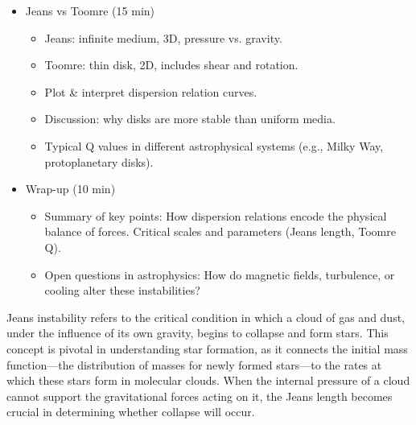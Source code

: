 \begin{itemize}
\begin{itemize}
    \item Define epicyclic frequency.

    \item Toomre parameter

  \end{itemize}
  
\item Jeans vs Toomre (15 min)

  \begin{itemize}
    \item Jeans: infinite medium, 3D, pressure vs. gravity.
    \item Toomre: thin disk, 2D, includes shear and rotation.

     \item Plot \& interpret dispersion relation curves.

     \item Discussion: why disks are more stable than uniform media.

     \item Typical Q values in different astrophysical systems (e.g., Milky Way, protoplanetary disks).
  \end{itemize}
  
\item Wrap-up (10 min)

  \begin{itemize}
    \item Summary of key points: How dispersion relations encode the
      physical balance of forces. Critical scales and parameters (Jeans length, Toomre Q).

    \item Open questions in astrophysics: How do magnetic fields, turbulence, or cooling alter these instabilities?

  \end{itemize}
  
\end{itemize}



Jeans instability refers to the critical condition in which a cloud of
gas and dust, under the influence of its own gravity, begins to
collapse and form stars. This concept is pivotal in understanding star
formation, as it connects the initial mass function—the distribution
of masses for newly formed stars—to the rates at which these stars
form in molecular clouds. When the internal pressure of a cloud cannot
support the gravitational forces acting on it, the Jeans length
becomes crucial in determining whether collapse will occur.

